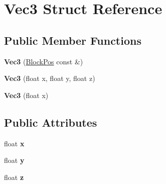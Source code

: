 \hypertarget{struct_vec3}{}\section{Vec3 Struct Reference}
\label{struct_vec3}
\subsection*{Public Member Functions}
\begin{DoxyCompactItemize}
\item 
\mbox{\label{struct_vec3_a466679c4861c2c4956f2ca2a1d99ef95}} 
{\bfseries Vec3} (\mbox{\hyperlink{struct_block_pos}{Block\+Pos}} const \&)
\item 
\mbox{\label{struct_vec3_a842ccdcdb2b4c7ca7cef20e6e786a231}} 
{\bfseries Vec3} (float x, float y, float z)
\item 
\mbox{\label{struct_vec3_ab59f8e1f33e07e94ff91f88837edcfa7}} 
{\bfseries Vec3} (float x)
\end{DoxyCompactItemize}
\subsection*{Public Attributes}
\begin{DoxyCompactItemize}
\item 
\mbox{\label{struct_vec3_a2814580e9b9372738c0a61197ea46b51}} 
float {\bfseries x}
\item 
\mbox{\label{struct_vec3_abc1d241232cb04aa98217a942402ae68}} 
float {\bfseries y}
\item 
\mbox{\label{struct_vec3_a64f3f00cd2dd9076999eeb2f05210388}} 
float {\bfseries z}
\end{DoxyCompactItemize}
